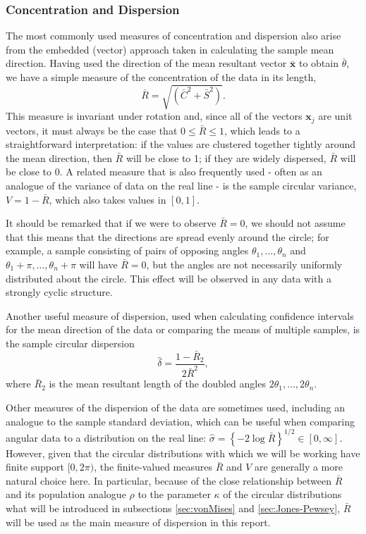 \documentclass[../../ArchStats.tex]{subfiles}
\begin{document}
\subsubsection{Concentration and Dispersion}
\label{sec:params-R}
The most commonly used measures of concentration and dispersion also arise from the embedded (vector) approach taken in calculating the sample mean direction. Having used the direction of the mean resultant vector $\mathbf{\bar{x}}$ to obtain $\bar{\theta}$, we have a simple measure of the concentration of the data in its length, 
	\begin{equation}
	\label{eqn:R-bar}
	\bar{R} = \sqrt{(\bar{C}^2 + \bar{S}^2)}.
	\end{equation}
This measure is invariant under rotation and, since all of the vectors $\mathbf{x}_j$ are unit vectors, it must always be the case that $0 \leq \bar{R} \leq 1$, which leads to a straightforward interpretation: if the values are clustered together tightly around the mean direction, then $\bar{R}$ will be close to 1; if they are widely dispersed, $\bar{R}$ will be close to 0. A related measure that is also frequently used - often as an analogue of the variance of data on the real line - is the sample circular variance, $V = 1- \bar{R}$, which also takes values in $[0,1]$. 

It should be remarked that if we were to observe $\bar{R} = 0$, we should not assume that this means that the directions are spread evenly around the circle; for example, a sample consisting of pairs of opposing angles $\theta_1, \dots, \theta_n$ and $\theta_1+\pi, \dots, \theta_n+\pi$ will have $\bar{R} = 0$, but the angles are not necessarily uniformly distributed about the circle. This effect will be observed in any data with a strongly cyclic structure.

Another useful measure of dispersion, used when calculating confidence intervals for the mean direction of the data or comparing the means of multiple samples, is the sample circular dispersion
	\begin{equation}
	\label{eqn:delta-i}
	\hat{\delta} = \frac{1-\bar{R}_2}{2\bar{R}^2},
	\end{equation}
where $\bar{R}_2$ is the mean resultant length of the doubled angles $2\theta_1, \dots, 2\theta_n$. 

Other measures of the dispersion of the data are sometimes used, including an analogue to the  sample standard deviation, which can be useful when comparing angular data to a distribution on the real line: $\hat{\sigma} = \left\lbrace -2 \log \bar{R} \right\rbrace ^{1/2} \in [0, \infty]$. However, given that the circular distributions with which we will be working have finite support $[0, 2\pi)$, the finite-valued measures $\bar{R}$ and $V$ are generally a more natural choice here. In particular, because of the close relationship between $\bar{R}$ and its population analogue $\rho$ to the parameter $\kappa$ of the circular distributions what will be introduced in subsections \ref{sec:vonMises} and \ref{sec:Jones-Pewsey}, $\bar{R}$ will be used as the main measure of dispersion in this report.
 
\end{document}
